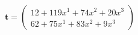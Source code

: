 \documentclass[preview]{standalone}
\begin{document}
\begin{align*}
\mathbf{t} = \begin{pmatrix}12 + 119x^{1} + 74x^{2} + 20x^{3} \\ 62 + 75x^{1} + 83x^{2} + 9x^{3}\end{pmatrix}
\end{align*}
\end{document}
